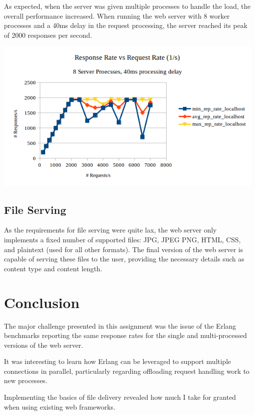 \documentclass[a4paper, 11pt]{article}
\begin{document}
As expected, when the server was given multiple processes to handle the load, the overall performance increased. When running the web server with 8 worker processes and a 40ms delay in the request processing, the server reached its peak of 2000 responses per second.

\includegraphics{fig-3-8proc-delay.png}

\subsection{File Serving}
As the requirements for file serving were quite lax, the web server only implements a fixed number of supported files: JPG, JPEG PNG, HTML, CSS, and plaintext (used for all other formats). The final version of the web server is capable of serving these files to the user, providing the necessary details such as content type and content length.

\section{Conclusion}
The major challenge presented in this assignment was the issue of the Erlang benchmarks reporting the same response rates for the single and multi-processed versions of the web server.

It was interesting to learn how Erlang can be leveraged to support multiple connections in parallel, particularly regarding offloading request handling work to new processes.

Implementing the basics of file delivery revealed how much I take for granted when using existing web frameworks.
\end{document}
